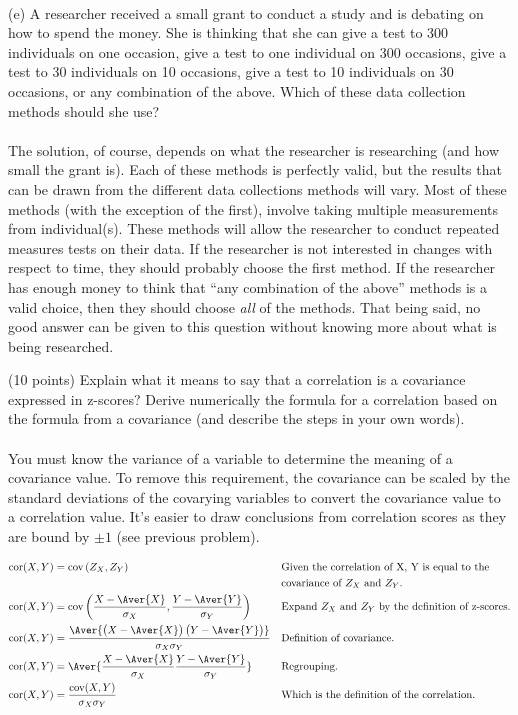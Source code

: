 \documentclass[onecolumn,10pt]{jhwhw}
\begin{document}
\\
(e) A researcher received a small grant to conduct a study and is debating on how to spend the money. She is thinking that she can give a test to 300 individuals on one occasion, give a test to one individual on 300 occasions, give a test to 30 individuals on 10 occasions, give a test to 10 individuals on 30 occasions, or any combination of the above. Which of these data collection methods should she use?\\
\\
The solution, of course, depends on what the researcher is researching (and how small the grant is). Each of these methods is perfectly valid, but the results that can be drawn from the different data collections methods will vary. Most of these methods (with the exception of the first), involve taking multiple measurements from individual(s). These methods will allow the researcher to conduct repeated measures tests on their data. If the researcher is not interested in changes with respect to time, they should probably choose the first method. If the researcher has enough money to think that ``any combination of the above'' methods is a valid choice, then they should choose \textit{all} of the methods. That being said, no good answer can be given to this question without knowing more about what is being researched.

{}

(10 points) Explain what it means to say that a correlation is a covariance expressed in z-scores? Derive numerically the formula for a correlation based on the formula from a covariance (and describe the steps in your own words).\\
\\
You must know the variance of a variable to determine the meaning of a covariance value. To remove this requirement, the covariance can be scaled by the standard deviations of the covarying variables to convert the covariance value to a correlation value. It's easier to draw conclusions from correlation scores as they are bound by $\pm 1$ (see previous problem).

\begin{align*}
\mbox{cor}(X, Y) &= \mbox{cov}\left( Z_X, Z_Y \right) && \text{Given the correlation of X, Y is equal to the} \\
& && \text{covariance of $Z_X$ and $Z_Y$.} \\
\mbox{cor}(X, Y) &= \mbox{cov} \left(\frac{X - \Aver{X}}{\sigma_X}, \frac{Y - \Aver{Y}}{\sigma_Y} \right) && \text{Expand $Z_X$ and $Z_Y$ by the definition of z-scores.}\\
\mbox{cor}(X, Y) &= \frac{\Aver{\left(X - \Aver{X} \right) \left(Y - \Aver{Y} \right) }}{\sigma_X \sigma_Y} && \text{Definition of covariance.} \\
\mbox{cor}(X, Y) &= \Aver{\frac{X - \Aver{X}}{\sigma_X } \frac{Y - \Aver{Y} }{\sigma_Y}} && \text{Regrouping.} \\
\mbox{cor}(X, Y) &= \frac{\mbox{cov}(X, Y)}{\sigma_X \sigma_Y} && \text{Which is the definition of the correlation.} \\
\end{align*}
\end{document}
